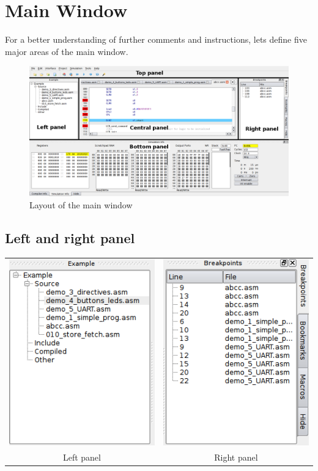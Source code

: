 \section{Main Window}
    For a better understanding of further comments and instructions, lets define five major areas of the main window.

   \begin{figure}[h]
        \centering
        \includegraphics[width=\textwidth]{img/Main_window.png}
        \caption{Layout of the main window}
    \end{figure}

    \clearpage
    \subsection{Left and right panel}
        \begin{table}[h!]
            \centering
            \begin{tabular}{cc}
                \includegraphics[width=.3\textwidth]{img/left_panel.png}
                    &
                \includegraphics[width=.3\textwidth]{img/right_panel.png}
                    \\
                Left panel & Right panel
            \end{tabular}
        \end{table}

